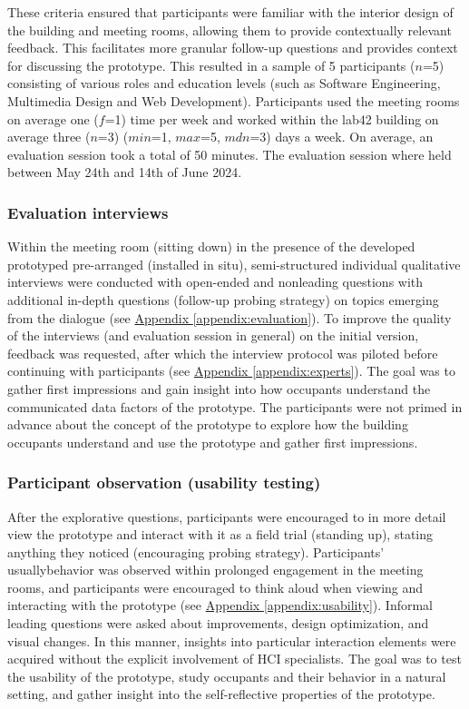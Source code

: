 These criteria ensured that participants were familiar with the interior design of the building and meeting rooms, allowing them to provide contextually relevant feedback. This facilitates more granular follow-up questions and provides context for discussing the prototype. This resulted in a sample of 5 participants ($n$=5) consisting of various roles and education levels (such as Software Engineering, Multimedia Design and Web Development). Participants used the meeting rooms on average one ($f$=1) time per week and worked within the lab42 building on average three ($n$=3) ($min$=1, $max$=5, $mdn$=3) days a week. On average, an evaluation session took a total of 50 minutes. The evaluation session where held between May 24th and 14th of June 2024. 

\subsubsection{Evaluation interviews}

Within the meeting room (sitting down) in the presence of the developed prototyped pre-arranged (installed in situ), semi-structured individual qualitative interviews were conducted with open-ended and nonleading questions with additional in-depth questions (follow-up probing strategy) on topics emerging from the dialogue (see \hyperref[appendix:evaluation]{Appendix \ref*{appendix:evaluation}}). To improve the quality of the interviews (and evaluation session in general) on the initial version, feedback was requested, after which the interview protocol was piloted before continuing with participants (see \hyperref[appendix:experts]{Appendix \ref*{appendix:experts}}). The goal was to gather first impressions and gain insight into how occupants understand the communicated data factors of the prototype. The participants were not primed in advance about the concept of the prototype to explore how the building occupants understand and use the prototype and gather first impressions.

\subsubsection{Participant observation (usability testing)}

After the explorative questions, participants were encouraged to in more detail view the prototype and interact with it as a field trial (standing up), stating anything they noticed (encouraging probing strategy). Participants' usuallybehavior was observed within prolonged engagement in the meeting rooms, and participants were encouraged to think aloud when viewing and interacting with the prototype (see \hyperref[appendix:usability]{Appendix \ref*{appendix:usability}}). Informal leading questions were asked about improvements, design optimization, and visual changes. In this manner, insights into particular interaction elements were acquired without the explicit involvement of HCI specialists. The goal was to test the usability of the prototype, study occupants and their behavior in a natural setting, and gather insight into the self-reflective properties of the prototype. 

